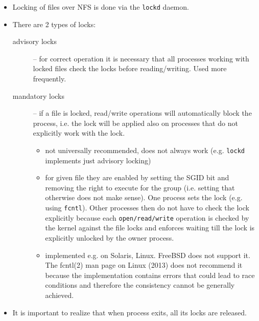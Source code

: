\begin{itemize}
\item Locking of files over NFS is done via the \texttt{lockd} daemon.
\item There are 2 types of locks:
    \begin{description}
    \item [advisory locks] -- for correct operation it is necessary that all
    processes working with locked files check the locks before reading/writing.
    Used more frequently.
    \item [mandatory locks] -- if a file is locked, read/write operations will
    automatically block the process, i.e. the lock will be applied also on
    processes that do not explicitly work with the lock.
        \begin{itemize}
	\item not universally recommended, does not always work
        (e.g. \texttt{lockd} implements just advisory locking)
	\item for given file they are enabled by setting the SGID bit and
        removing the right to execute for the group
	(i.e. setting that otherwise does not make sense).
	One process sets the lock (e.g. using \texttt{fcntl}). Other processes
	then do not have to check the lock explicitly because each
	\texttt{open/read/write} operation is checked by the kernel against
	the file locks and enforces waiting till the lock is explicitly
	unlocked by the owner process.\\
	\item implemented e.g. on Solaris, Linux. FreeBSD does not support it.
	The fcntl(2) man page on Linux (2013) does not recommend it because
	the implementation contains errors that could lead to race conditions
	and therefore the consistency cannot be generally achieved.
        \end{itemize}
    \end{description}
\item It is important to realize that when process exits, all its locks are
released.
\end{itemize}



